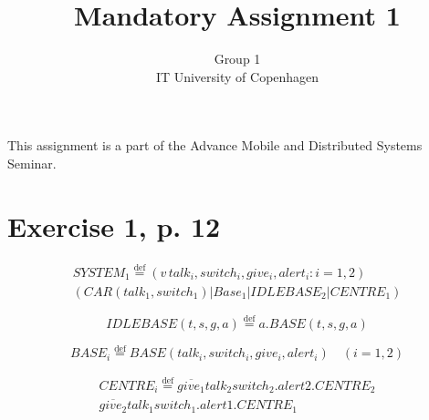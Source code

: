 \documentclass[11pt]{article}
\begin{document}
\title{Mandatory Assignment 1}
\author{Group 1\\
IT University of Copenhagen}
\renewcommand{\today}{September 22, 2012}
\maketitle
This assignment is a part of the Advance Mobile and Distributed Systems Seminar.

\section {Exercise 1, p. 12}

\begin{equation}
\begin{split}
SYSTEM_1 \stackrel{\mathrm{def}}{=} (v\,talk_i , switch_i , give_i , alert_i : i = 1,2) \\
(CAR(talk_1 , switch_1) | Base_1 | IDLEBASE_2 | CENTRE_1)
\end{split}
\end{equation}

\begin{equation}
IDLEBASE(t, s, g, a) \stackrel{\mathrm{def}}{=} a.BASE(t,s,g,a)
\end{equation}

\begin{equation}
BASE_i \stackrel{\mathrm{def}}{=} BASE(talk_i , switch_i , give_i , alert_i) \quad (i=1,2)
\end{equation}

\begin{equation}
\begin{split}
CENTRE_i \stackrel{\mathrm{def}}{=} \overline{give_1}talk_2switch_2.alert2.CENTRE_2 \\ 
\overline{give_2}talk_1switch_1.alert1.CENTRE_1 
\end{split}
\end{equation}
\end{document}
